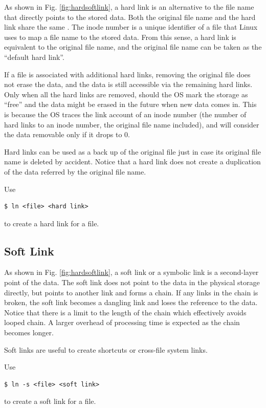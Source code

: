 As shown in Fig. \ref{fig:hardsoftlink}, a hard link is an alternative to the file name that directly points to the stored data. Both the original file name and the hard link share the same . The inode number is a unique identifier of a file that Linux uses to map a file name to the stored data. From this sense, a hard link is equivalent to the original file name, and the original file name can be taken as the ``default hard link''.

If a file is associated with additional hard links, removing the original file does not erase the data, and the data is still accessible via the remaining hard links. Only when all the hard links are removed, should the OS mark the storage as ``free'' and the data might be erased in the future when new data comes in. This is because the OS traces the link account of an inode number (the number of hard links to an inode number, the original file name included), and will consider the data removable only if it drops to 0.

Hard links can be used as a back up of the original file just in case its original file name is deleted by accident. Notice that a hard link does not create a duplication of the data referred by the original file name. 

Use
\begin{lstlisting}
$ ln <file> <hard link>
\end{lstlisting}
to create a hard link for a file.

\subsection{Soft Link}

As shown in Fig. \ref{fig:hardsoftlink}, a soft link or a symbolic link is a second-layer point of the data. The soft link does not point to the data in the physical storage directly, but points to another link and forms a chain. If any links in the chain is broken, the soft link becomes a dangling link and loses the reference to the data. Notice that there is a limit to the length of the chain which effectively avoids looped chain. A larger overhead of processing time is expected as the chain becomes longer.

Soft links are useful to create shortcuts or cross-file system links.

Use
\begin{lstlisting}
$ ln -s <file> <soft link>
\end{lstlisting}
to create a soft link for a file.

